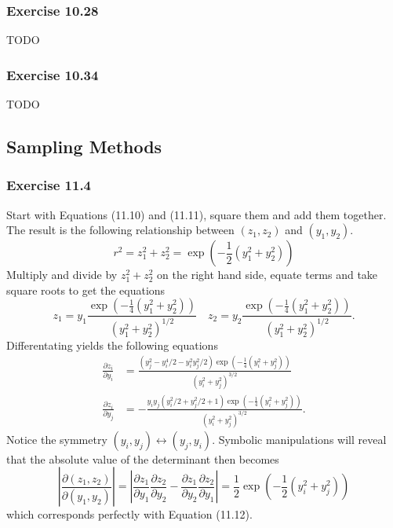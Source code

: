\documentclass[12pt, a4paper]{article}
\newcommand{\abs}[1]{\left\lvert#1\right\rvert}
\begin{document}
\subsubsection*{Exercise 10.28}
TODO

\subsubsection*{Exercise 10.34}
TODO



\subsection{Sampling Methods}

\subsubsection*{Exercise 11.4}
Start with Equations (11.10) and (11.11), square them and add them together.
The result is the following relationship between $(z_1, z_2)$ and $(y_1, y_2)$.
\begin{equation*}
	r^2 = z_1^2 + z_2^2 = \exp \left( -\frac{1}{2} \left( y_1^2 + y_2^2 \right)  \right)
\end{equation*}
Multiply and divide by $z_1^2 + z_2^2$ on the right hand side, equate terms and take square roots to get the equations
\begin{equation*}
	z_1 = y_1 \frac{\exp \left( -\frac{1}{4} \left( y_1^2 + y_2^2 \right)  \right)}{\left(y_1^2 + y_2^2\right)^{1/2}}
	\quad
	z_2 = y_2 \frac{\exp \left( -\frac{1}{4} \left( y_1^2 + y_2^2 \right)  \right)}{\left(y_1^2 + y_2^2\right)^{1/2}}.
\end{equation*}
Differentating yields the following equations
\begin{align*}
\frac{\partial z_i}{\partial y_i}
&=
	\frac{\left(y_{j}^{2} - y_{i}^{4}/2 -  y_{i}^{2} y_{j}^{2}/2 \right) \exp \left( -\frac{1}{4} \left( y_i^2 + y_j^2 \right)  \right)}{\left(y_{i}^{2} + y_{j}^{2}\right)^{3/2}} \\
	\frac{\partial z_i}{\partial y_j}
	&=
	- \frac{y_{i} y_{j} \left(y_{i}^{2} /2 + y_{j}^{2} /2 + 1\right) \exp \left( -\frac{1}{4} \left( y_i^2 + y_j^2 \right)  \right)}{\left(y_{i}^{2} + y_{j}^{2}\right)^{3/2}}.
\end{align*}
Notice the symmetry $(y_i, y_j) \leftrightarrow (y_j, y_i)$.
Symbolic manipulations will reveal that the absolute value of the determinant then becomes
\begin{equation*}
	\abs{\frac{\partial (z_1, z_2)}{\partial (y_1, y_2)}}
	=
	\abs{ \frac{\partial z_1}{\partial y_1} \frac{\partial z_2}{\partial y_2}
		- \frac{\partial z_1}{\partial y_2} \frac{\partial z_2}{\partial y_1} }
	=
	\frac{1}{2} \exp \left( -\frac{1}{2} \left( y_i^2 + y_j^2 \right)  \right)
\end{equation*}
which corresponds perfectly with Equation (11.12).
\end{document}
